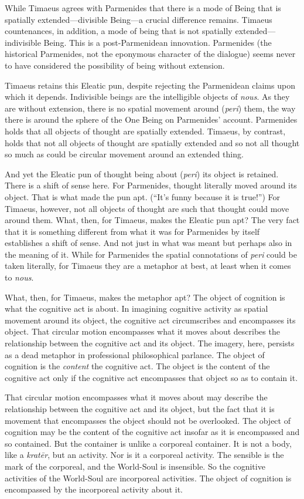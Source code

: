 While Timaeus agrees with Parmenides that there is a mode of Being that is spatially extended---divisible Being---a crucial difference remains. Timaeus countenances, in addition, a mode of being that is not spatially extended---indivisible Being. This is a post-Parmenidean innovation. Parmenides (the historical Parmenides, not the eponymous character of the dialogue) seems never to have considered the possibility of being without extension.

Timaeus retains this Eleatic pun, despite rejecting the Parmenidean claims upon which it depends. Indivisible beings are the intelligible objects of \emph{nous}. As they are without extension, there is no spatial movement around (\emph{peri}) them, the way there is around the sphere of the One Being on Parmenides' account. Parmenides holds that all objects of thought are spatially extended. Timaeus, by contrast, holds that not all objects of thought are spatially extended and so not all thought so much as could be circular movement around an extended thing.

And yet the Eleatic pun of thought being about (\emph{peri}) its object is retained. There is a shift of sense here. For Parmenides, thought literally moved around its object. That is what made the pun apt. (``It's funny because it is true!'') For Timaeus, however, not all objects of thought are such that thought could move around them. What, then, for Timaeus, makes the Eleatic pun apt? The very fact that it is something different from what it was for Parmenides by itself establishes a shift of sense. And not just in what was meant but perhaps also in the meaning of it. While for Parmenides the spatial connotations of \emph{peri} could be taken literally, for Timaeus they are a metaphor at best, at least when it comes to \emph{nous}.

What, then, for Timaeus, makes the metaphor apt? The object of cognition is what the cognitive act is about. In imagining cognitive activity as spatial movement around its object, the cognitive act circumscribes and encompasses its object. That circular motion encompasses what it moves about describes the relationship between the cognitive act and its object. The imagery, here, persists as a dead metaphor in professional philosophical parlance. The object of cognition is the \emph{content} the cognitive act. The object is the content of the cognitive act only if the cognitive act encompasses that object so as to contain it. 

That circular motion encompasses what it moves about may describe the relationship between the cognitive act and its object, but the fact that it is movement that encompasses the object should not be overlooked. The object of cognition may be the content of the cognitive act insofar as it is encompassed and so contained. But the container is unlike a corporeal container. It is not a body, like a \emph{kratēr}, but an activity. Nor is it a corporeal activity. The sensible is the mark of the corporeal, and the World-Soul is insensible. So the cognitive activities of the World-Soul are incorporeal activities. The object of cognition is encompassed by the incorporeal activity about it.

